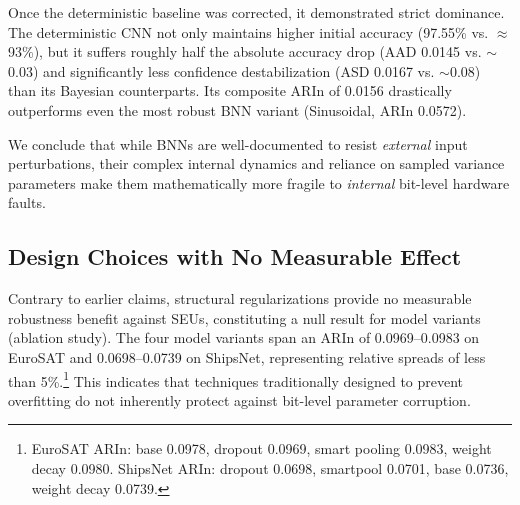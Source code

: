 \documentclass[a4paper,twoside]{article}
\begin{document}
Once the deterministic baseline was corrected, it demonstrated strict dominance. The deterministic CNN not only maintains higher initial accuracy (97.55\% vs. $\approx$93\%), but it suffers roughly half the absolute accuracy drop (AAD 0.0145 vs. $\sim$0.03) and significantly less confidence destabilization (ASD 0.0167 vs. $\sim$0.08) than its Bayesian counterparts. Its composite ARIn of 0.0156 drastically outperforms even the most robust BNN variant (Sinusoidal, ARIn 0.0572).

\begin{table}[h]
\centering
\caption{Direct comparison of Deterministic and Bayesian CNN baselines on ShipsNet. The deterministic CNN is strictly superior across all robustness metrics and initial accuracy.}
\label{tab:baseline}
\end{table}

We conclude that while BNNs are well-documented to resist \textit{external} input perturbations, their complex internal dynamics and reliance on sampled variance parameters make them mathematically more fragile to \textit{internal} bit-level hardware faults.

\subsection{Design Choices with No Measurable Effect}
Contrary to earlier claims, structural regularizations provide no measurable robustness benefit against SEUs, constituting a null result for model variants (ablation study). The four model variants span an ARIn of 0.0969--0.0983 on EuroSAT and 0.0698--0.0739 on ShipsNet, representing relative spreads of less than 5\%.\footnote{EuroSAT ARIn: base 0.0978, dropout 0.0969, smart pooling 0.0983, weight decay 0.0980. ShipsNet ARIn: dropout 0.0698, smartpool 0.0701, base 0.0736, weight decay 0.0739.} This indicates that techniques traditionally designed to prevent overfitting do not inherently protect against bit-level parameter corruption.

\end{document}
